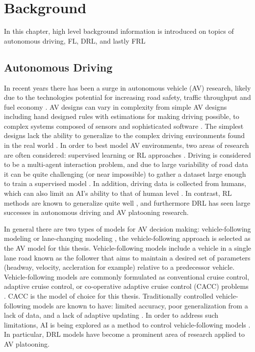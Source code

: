 \chapter{Background} \label{chap:background}
In this chapter, high level background information is introduced on topics of autonomous
driving, FL, DRL, and lastly FRL

\section{Autonomous Driving}
In recent years there has been a surge in autonomous vehicle (AV) research, likely due
to the technologies potential for increasing road safety, traffic throughput and fuel
economy \cite{Makantasis2020a, Ye2019}. AV designs can vary in complexity from simple
AV designs including hand designed rules with estimations for making driving possible,
to complex systems composed of sensors and sophisticated software  \cite{Makantasis2020a}.
The simplest designs lack the ability to generalize to the complex driving environments
found in the real world \cite{Makantasis2020a}. In order to best model AV environments,
two areas of research are often considered: supervised learning or RL approaches
\cite{Makantasis2020a}.  Driving is considered to be a multi-agent interaction problem,
and due to large variability of road data it can be quite challenging (or near impossible)
to gather a dataset large enough to train a supervised model \cite{ElSallab2017a}.
In addition, driving data is collected from humans, which can also limit an AI's ability
to that of human level \cite{Ye2019}. In contrast, RL methods are known to generalize
quite well \cite{Makantasis2020a} \cite{Makantasis2020a}, and furthermore DRL has seen
large successes in autonomous driving and AV platooning research.

In general there are two types of models for AV decision making: vehicle-following
modeling or lane-changing modeling \cite{Ye2019}, the vehicle-following approach is
selected as the AV model for this thesis.  Vehicle-following
models include a vehicle in a single lane road  known as the follower that aims to maintain
a desired set of parameters (headway, velocity, accleration for example) relative to a
predecessor vehicle.  Vehicle-following models are commonly formulated as conventional cruise control,
adaptive cruise control, or co-operative adaptive cruise control (CACC) problems \cite{Mil2014}.
CACC is the model of choice for this thesis. Traditionally controlled vehicle-following models
are known to have: limited accuracy, poor generalization from a lack of data,
and a lack of adaptive updating \cite{Zhu2018}. In order to address such limitations,
AI is being explored as a method to control vehicle-following models \cite{Zhu2018}.
In particular, DRL models have become a prominent area of research applied to AV platooning.


